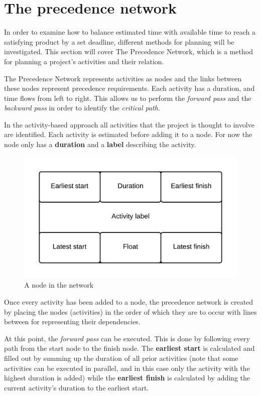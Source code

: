 \documentclass[../report.tex]{subfiles}
\begin{document}
\graphicspath{{img/}{../img/}}

\section{The precedence network}
In order to examine how to balance estimated time with available time to reach a satisfying product by a set deadline, different methods for planning will be investigated. This section will cover The Precedence Network, which is a method for planning a project's activities and their relation.

The Precedence Network represents activities as nodes and the links between these nodes represent precedence requirements. Each activity has a duration, and time flows from left to right. This allows us to perform the \textit{forward pass} and the \textit{backward pass} in order to identify the \textit{critical path}.

In the activity-based approach all activities that the project is thought to involve are identified. Each activity is estimated before adding it to a node. For now the node only has a \textbf{duration} and a \textbf{label} describing the activity.

\begin{figure}[H]
\centering
	\includegraphics[scale=0.12]{networkNode.png}
\caption{A node in the network}
\end{figure}

Once every activity has been added to a node, the precedence network is created by placing the nodes (activities) in the order of which they are to occur with lines between for representing their dependencies.

At this point, the \textit{forward pass} can be executed. This is done by following every path from the start node to the finish node. The \textbf{earliest start} is calculated and filled out by summing up the duration of all prior activities (note that some activities can be executed in parallel, and in this case only the activity with the highest duration is added) while the \textbf{earliest finish} is calculated by adding the current activity's duration to the earliest start.
\end{document}
